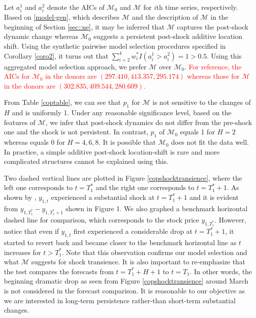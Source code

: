 \documentclass[11pt]{article}
\def\mc#1{\mathcal{#1}} %
\def\mc#1{\mathcal{#1}}
\theoremstyle{definition}
\begin{document}
Let $a_i^1$ and $a_i^2$ denote the AICs of $\mc{M}_0$ and $\mc{M}$ for $i$th time series, respectively. Based on \eqref{model-gen}, which describes $\mc{M}$ and the description of $\mc{M}$ in the beginning of Section \ref{sec::ne}, it may be inferred that $\mc{M}$ captures the post-shock dynamic change whereas $\mc{M}_0$ suggests a persistent post-shock additive location shift. Using the synthetic pairwise model selection procedures specified in Corollary \ref{coro2}, it turns out that $\sum_{i=2}^4 w_i^* I(a_i^1 > a_i^2)=1 >0.5$. Using this aggregated model selection approach, we prefer $\mc{M}$ over $\mc{M}_0$. \textcolor{red}{For reference, the AICs for $\mc{M}_0$ in the donors are $(297.410, 413.357, 295.174)$ whereas those for $\mc{M}$ in the donors are $(302.835, 409.544, 280.609)$. }

From Table \ref{coptable}, we can see that $p_1$ for $\mc{M}$ is not sensitive to the changes of $H$ and is uniformly 1. Under any reasonable significance level, based on the features of $\mc{M}$, we infer that post-shock dynamics do not differ from the pre-shock one and the shock is not persistent. In contrast, $p_1$ of $\mc{M}_0$ equals 1 for $H = 2$ whereas equals 0 for $H = 4, 6, 8$. It is possible that $\mc{M}_0$ does not fit the data well. In practice, a simple additive post-shock location-shift is rare and more complicated structures cannot be explained using this. 

Two dashed vertical lines are plotted in Figure \ref{copshocktransience}, where the left one corresponds to $t = T_1^*$ and the right one  corresponds to $t = T_1^*+1$. As shown by \cite{lin2021minimizing}, $y_{1,t}$ experienced a substantial shock at  $t = T_1^*+1$ and it is evident from $y_{1, T_1^*}-y_{1, T_1^*+1}$ shown in Figure 1. We also graphed a benchmark horizontal dashed line for comparison, which corresponds to the stock price $y_{1, T_1^*}$. However, notice that even if $y_{1,t}$ first experienced a considerable drop at $t = T_1^*+1$,   it started to revert back and became closer to the benchmark horizontal line as $t$ increases for $t > T_1^*$. Note that this observation confirms our model selection and what $\mc{M}$ suggests for shock transience. It is also important to re-emphasize that  the test compares the forecasts from $t = T_1^* + H+1$ to $t=T_1$. In other words, the beginning dramatic drop as seen from Figure \ref{copshocktransience} around March is not considered in the forecast comparison. It is reasonable to our objective as we are interested in long-term persistence rather-than short-term substantial changes. 
\end{document}
